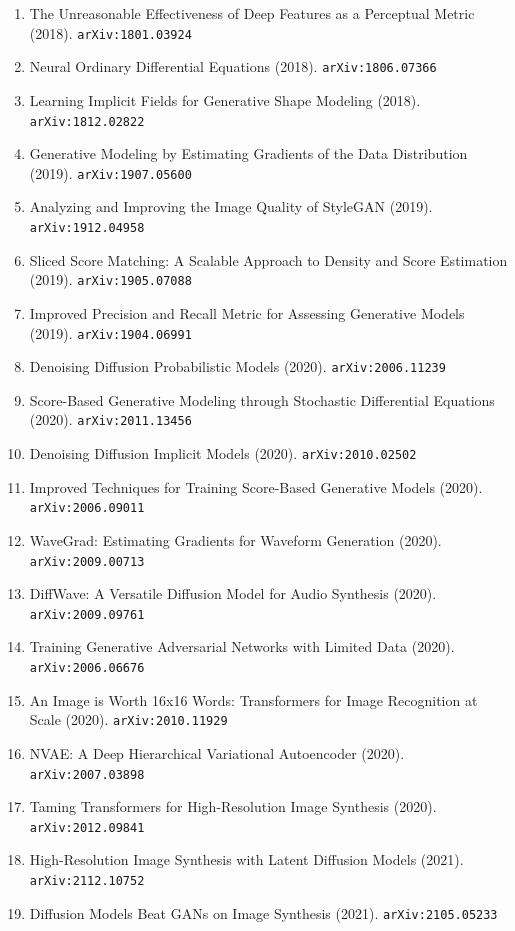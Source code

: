 \documentclass[11pt]{article}
\begin{document}
\begin{enumerate}
  \item The Unreasonable Effectiveness of Deep Features as a Perceptual Metric (2018). \texttt{arXiv:1801.03924}
  \item Neural Ordinary Differential Equations (2018). \texttt{arXiv:1806.07366}
  \item Learning Implicit Fields for Generative Shape Modeling (2018). \texttt{arXiv:1812.02822}
  \item Generative Modeling by Estimating Gradients of the Data Distribution (2019). \texttt{arXiv:1907.05600}
  \item Analyzing and Improving the Image Quality of StyleGAN (2019). \texttt{arXiv:1912.04958}
  \item Sliced Score Matching: A Scalable Approach to Density and Score
  Estimation (2019). \texttt{arXiv:1905.07088}
  \item Improved Precision and Recall Metric for Assessing Generative Models (2019). \texttt{arXiv:1904.06991}
  \item Denoising Diffusion Probabilistic Models (2020). \texttt{arXiv:2006.11239}
  \item Score-Based Generative Modeling through Stochastic Differential
  Equations (2020). \texttt{arXiv:2011.13456}
  \item Denoising Diffusion Implicit Models (2020). \texttt{arXiv:2010.02502}
  \item Improved Techniques for Training Score-Based Generative Models (2020). \texttt{arXiv:2006.09011}
  \item WaveGrad: Estimating Gradients for Waveform Generation (2020). \texttt{arXiv:2009.00713}
  \item DiffWave: A Versatile Diffusion Model for Audio Synthesis (2020). \texttt{arXiv:2009.09761}
  \item Training Generative Adversarial Networks with Limited Data (2020). \texttt{arXiv:2006.06676}
  \item An Image is Worth 16x16 Words: Transformers for Image Recognition at
  Scale (2020). \texttt{arXiv:2010.11929}
  \item NVAE: A Deep Hierarchical Variational Autoencoder (2020). \texttt{arXiv:2007.03898}
  \item Taming Transformers for High-Resolution Image Synthesis (2020). \texttt{arXiv:2012.09841}
  \item High-Resolution Image Synthesis with Latent Diffusion Models (2021). \texttt{arXiv:2112.10752}
  \item Diffusion Models Beat GANs on Image Synthesis (2021). \texttt{arXiv:2105.05233}

\end{enumerate}
\end{document}
